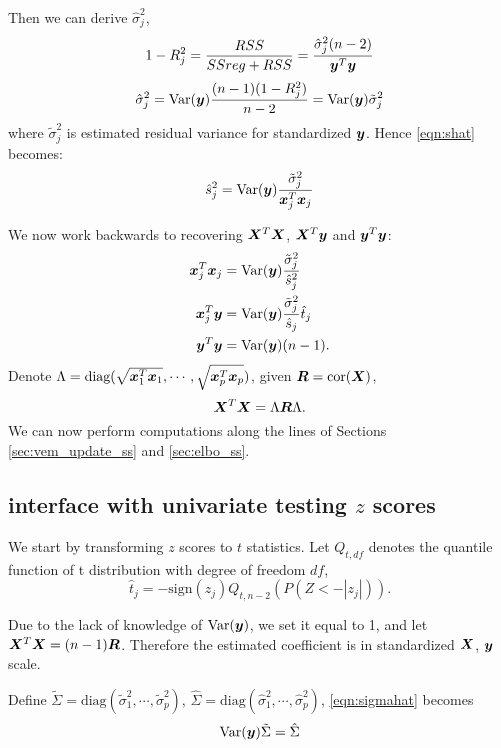 Then we can derive $\hat{\sigma}_{j}^{2}$,
\begin{equation}
    1-R_{j}^{2} = \frac{RSS}{SSreg + RSS} = \frac{\hat{\sigma}_{j}^2(n-2)}{\bm y^{T}\bm y}
\end{equation}
\begin{equation}
    \hat{\sigma}_{j}^2 = \text{Var}(\bm y)\frac{(n-1)(1-R_{j}^2)}{n-2} = \text{Var}(\bm y) \tilde{\sigma}_{j}^2 \label{eqn:sigmahat}
\end{equation}
where $\tilde{\sigma}_j^2$ is estimated residual variance for standardized $\bm y$. Hence \eqref{eqn:shat} becomes:
\begin{equation}
    \hat{s}_{j}^{2} = \text{Var}(\bm y)\frac{\tilde{\sigma}_{j}^2}{\bm x_j^{T}\bm x_j}
\end{equation}

We now work backwards to recovering $\bm X^T\bm X$, $\bm X^T\bm y$ and $\bm y^T\bm y$:
\begin{align}
    \bm x_j^{T}\bm x_j &= \text{Var}(\bm y)\frac{\tilde{\sigma}_{j}^2}{\hat{s}_{j}^{2}} \\
    \bm x_j^{T}\bm y &= \text{Var}(\bm y)\frac{\tilde{\sigma}_{j}^2}{\hat{s}_{j}} \hat{t}_{j} \\
    \bm y^T\bm y &= \text{Var}(\bm y)(n-1).
\end{align}
Denote $\Lambda = \text{diag}(\sqrt{\bm x_1^{T}\bm x_1}, \cdots, \sqrt{\bm x_p^{T}\bm x_p})$, given $\bm R = \text{cor}(\bm X)$,
\begin{equation}
    \bm X^T \bm X = \Lambda \bm R \Lambda.
\end{equation}
We can now perform \susie computations along the lines of Sections \ref{sec:vem_update_ss} and \ref{sec:elbo_ss}.

\subsection{\susie interface with univariate testing $z$ scores}

We start by transforming $z$ scores to $t$ statistics. Let $Q_{t,df}$ denotes the quantile function of t distribution with degree of freedom $df$,
\begin{equation}
    \hat{t}_{j} = -\text{sign}(z_{j}) Q_{t,n-2}(P(Z < -|z_{j}|)).
\end{equation}

Due to the lack of knowledge of $\text{Var}(\bm y)$,  we set it equal to 1, and let $\bm X^T \bm X = (n-1) \bm R$. Therefore the estimated coefficient is in standardized $\bm X$, $\bm y$ scale.

Define $\tilde{\Sigma} = \text{diag}(\tilde{\sigma}_{1}^2, \cdots, \tilde{\sigma}_{p}^2)$, $\hat{\Sigma} = \text{diag}(\hat{\sigma}_{1}^2, \cdots, \hat{\sigma}_{p}^2)$, \eqref{eqn:sigmahat} becomes
\begin{equation}
    \text{Var}(\bm y)\tilde{\Sigma} = \hat{\Sigma}
\end{equation}

